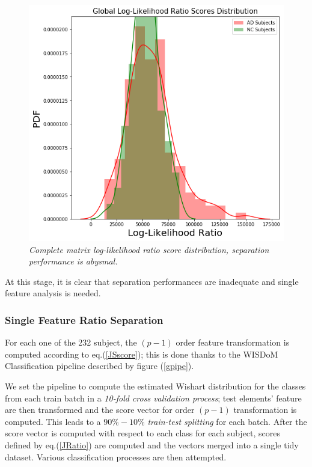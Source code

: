 \documentclass[12pt,openright,twoside,a4paper]{book}
\begin{document}
\begin{figure}[!h]
\centering
\includegraphics[scale=0.5]{ADNI-Rglobal}
\caption{\textit{Complete matrix log-likelihood ratio score distribution, separation performance is abysmal.}}
\label{ADNI-Rglobal}
\end{figure}

At this stage, it is clear that separation performances are inadequate and single feature analysis is needed.

\subsubsection{Single Feature Ratio Separation}

For each one of the 232 subject, the $(p-1)$ order feature transformation is computed according to eq.(\ref{JSscore}); this is done thanks to the WISDoM Classification pipeline described by figure (\ref{gpipe}).

We set the pipeline to compute the estimated Wishart distribution for the classes from each train batch in a \textit{10-fold cross validation process}; test elements' feature are then transformed and the score vector for order $(p-1)$ transformation is computed.
This leads to a $90\%-10\%$  \textit{train-test splitting} for each batch.
After the score vector is computed with respect to each class for each subject, scores defined by eq.(\ref{JRatio}) are computed and the vectors merged into a single tidy dataset.
Various classification processes are then attempted.
\end{document}
